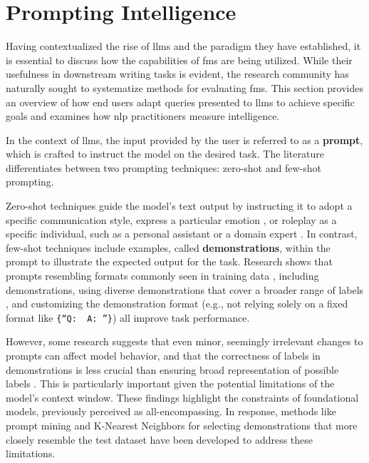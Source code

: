 \section{Prompting Intelligence}

Having contextualized the rise of \glspl{llm} and the paradigm they have established, it is essential to discuss how the capabilities of \glspl{fm} are being utilized. While their usefulness in downstream writing tasks is evident, the research community has naturally sought to systematize methods for evaluating \glspl{fm}. This section provides an overview of how end users adapt queries presented to \glspl{llm} to achieve specific goals and examines how \gls{nlp} practitioners measure intelligence.

\pskip

In the context of \glspl{llm}, the input provided by the user is referred to as a \textbf{prompt}, which is crafted to instruct the model on the desired task. The literature differentiates between two prompting techniques: zero-shot and few-shot prompting.

\pskip

Zero-shot techniques guide the model’s text output by instructing it to adopt a specific communication style, express a particular emotion \cite{emotionalstimuli} \cite{boundingcapacities}, or roleplay as a specific individual, such as a personal assistant or a domain expert \cite{roleplaying} \cite{helpfulassistant}. In contrast, few-shot techniques \cite{gpt3} include examples, called \textbf{demonstrations}, within the prompt to illustrate the expected output for the task. Research shows that prompts resembling formats commonly seen in training data \cite{Jiang2020}, including demonstrations, using diverse demonstrations that cover a broader range of labels \cite{su2022selectiveannotationmakeslanguage} \cite{min2020ambigqaansweringambiguousopendomain}, and customizing the demonstration format (e.g., not relying solely on a fixed format like \verb+{“Q:  A: ”}+) \cite{Jiang2020} all improve task performance.

\pskip

However, some research suggests that even minor, seemingly irrelevant changes to prompts can affect model behavior, and that the correctness of labels in demonstrations is less crucial than ensuring broad representation of possible labels \cite{min2020ambigqaansweringambiguousopendomain} \cite{wei2023chainofthoughtpromptingelicitsreasoning}. This is particularly important given the potential limitations of the model’s context window. These findings highlight the constraints of foundational models, previously perceived as all-encompassing. In response, methods like prompt mining \cite{Jiang2020} and K-Nearest Neighbors for selecting demonstrations that more closely resemble the test dataset \cite{liu2021makesgoodincontextexamples} have been developed to address these limitations.

